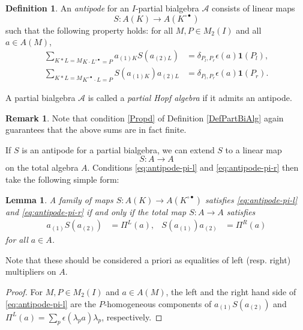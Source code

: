 \documentclass[10pt]{article}
\newcommand{\wmult}{\cdot}
\newcommand{\bmult}{*}
\newtheorem{Lem}[Theorem]{Lemma}
\theoremstyle{definition}
\newtheorem{Def}[Theorem]{Definition}
\newtheorem{Rem}[Theorem]{Remark}
\numberwithin{equation}{section}
\begin{document}
\begin{Def}\label{DefPartBiAlgAnt} An \emph{antipode} for an
  $I$-partial bialgebra $\mathscr{A}$ consists of linear
maps \[S:A(K)\rightarrow A(K^{\circ\bullet})\]
  such that the following property holds: for all $M,P\in M_2(I)$ and
  all $a\in A(M)$, \begin{align} \label{eq:antipode-pi-l}\underset{K\wmult
      L^{\circ\bullet}=P}{\sum_{K\bmult L = M}} a_{(1)K}S(a_{(2)L})&=
    \delta_{P_l,P_r}\epsilon(a)\mathbf{1}(P_l),
    \\ \label{eq:antipode-pi-r}
    \underset{K^{\circ\bullet}\wmult L=P}{\sum_{K\bmult L = M}}
    S(a_{(1)K})a_{(2)L}&=
    \delta_{P_l,P_r}\epsilon(a)\mathbf{1}(P_r).\end{align}

A partial bialgebra $\mathscr{A}$ is called a \emph{partial Hopf algebra} if it admits an antipode.
\end{Def} 

\begin{Rem} Note that condition \ref{Propd} of Definition \ref{DefPartBiAlg} again guarantees that the above sums are in fact finite.
\end{Rem}

If $S$ is an antipode for a partial bialgebra, we can extend $S$ to a
linear map \[S:A\rightarrow A\] on the total algebra $A$.  Conditions
\eqref{eq:antipode-pi-l} and \eqref{eq:antipode-pi-r} then take the
following simple form:
\begin{Lem} \label{lemma:antipode}
  A family of maps $S \colon A(K) \to A(K^{\circ\bullet})$ satisfies
  \eqref{eq:antipode-pi-l} and \eqref{eq:antipode-pi-r} if and only if
  the total map $S\colon A \to A$ satisfies 
  \begin{align} \label{eq:total-antipode}
 a_{(1)}S(a_{(2)}) &= \Pi^{L}(a), &
 S(a_{(1)})a_{(2)} &= \Pi^{R}(a)
  \end{align}
for all $a\in A$.
\end{Lem}

Note that these should be considered a priori as equalities of left (resp. right) multipliers on $A$.

\begin{proof}
For $M,P\in M_{2}(I)$ and $a\in A(M)$, the left and the right hand side  of \eqref{eq:antipode-pi-l} are the $P$-homogeneous components of $ a_{(1)}S(a_{(2)})$ and $\Pi^{L}(a)=\sum_{p} \epsilon(\lambda_{p}a)\lambda_{p}$, respectively.
\end{proof}
\end{document}
